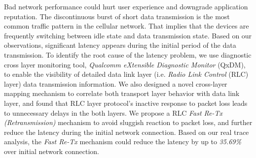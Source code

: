 
Bad network performance could hurt user experience and downgrade application reputation. The discontinuous burst of short data transmission is the most common traffic pattern in the cellular network. That implies that the devices are frequently switching between idle state and data transmission state. Based on our observations, significant latency appears during the initial period of the data transmission. To identify the root cause of the latency problem, we use diagnostic cross layer monitoring tool, \textit{Qualcomm eXtensible Diagnostic Monitor} (QxDM), to enable the visibility of detailed data link layer (i.e. \textit{Radio Link Control} (RLC) layer) data transmission information. We also designed a novel cross-layer mapping mechanism to correlate both transport layer behavior with data link layer, and found that RLC layer protocol's inactive response to packet loss leads to unnecessary delays in the both layers. We propose a RLC \textit{Fast Re-Tx (Retransmission)} mechanism to avoid sluggish reaction to packet loss, and further reduce the latency during the initial network connection. Based on our real trace analysis, the \textit{Fast Re-Tx} mechanism could reduce the latency by up to \textit{35.69\%} over initial network connection.

